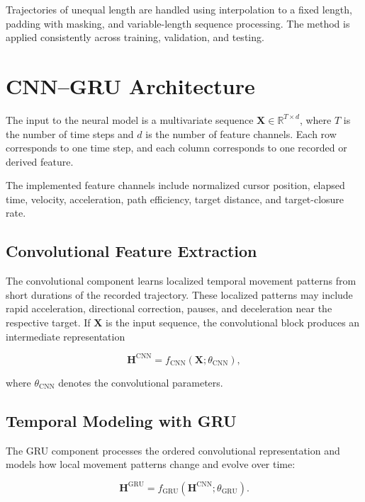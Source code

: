 \documentclass[conference]{IEEEtran}
\begin{document}
Trajectories of unequal length are handled using interpolation to a fixed length, padding with masking, and variable-length sequence processing. The method is applied consistently across training, validation, and testing. 

\section{CNN--GRU Architecture}

The input to the neural model is a multivariate sequence $\mathbf{X}\in\mathbb{R}^{T\times d}$, where $T$ is the number of time steps and $d$ is the number of feature channels. Each row corresponds to one time step, and each column corresponds to one recorded or derived feature. 

The implemented feature channels include normalized cursor position, elapsed time, velocity, acceleration, path efficiency, target distance, and target-closure rate. 

\subsection{Convolutional Feature Extraction}

The convolutional component learns localized temporal movement patterns from short durations of the recorded trajectory. These localized patterns may include rapid acceleration, directional correction, pauses, and deceleration near the respective target. If $\mathbf{X}$ is the input sequence, the convolutional block produces an intermediate representation

\begin{equation}
\mathbf{H}^{\mathrm{CNN}}
=
f_{\mathrm{CNN}}(\mathbf{X};\theta_{\mathrm{CNN}}),
\label{eq:cnn_representation}
\end{equation}

where $\theta_{\mathrm{CNN}}$ denotes the convolutional parameters.

\subsection{Temporal Modeling with GRU}

The GRU component processes the ordered convolutional representation and models how local movement patterns change and evolve over time:

\begin{equation}
\mathbf{H}^{\mathrm{GRU}}
=
f_{\mathrm{GRU}}
\left(
\mathbf{H}^{\mathrm{CNN}};
\theta_{\mathrm{GRU}}
\right).
\label{eq:gru_representation}
\end{equation}
\end{document}
